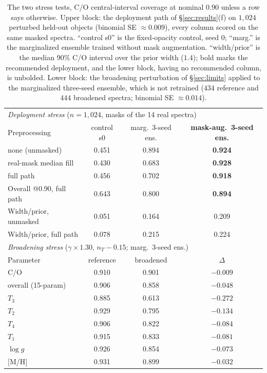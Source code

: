 \documentclass{article}
\begin{document}
\begin{table}[h]
\centering
\caption{The two stress tests, C/O central-interval coverage at nominal $0.90$
unless a row says otherwise. Upper block: the deployment path of
\S\ref{sec:results}(f) on $1{,}024$ perturbed held-out objects (binomial SE
$\approx0.009$), every column scored on the same masked spectra. ``control s0''
is the fixed-opacity control, seed 0; ``marg.'' is the marginalized ensemble
trained without mask augmentation. ``width/prior'' is the median $90\%$ C/O
interval over the prior width ($1.4$); bold marks the recommended deployment, and
the lower block, having no recommended column, is unbolded. Lower block: the
broadening perturbation of \S\ref{sec:limits} applied to the marginalized
three-seed ensemble, which is not retrained ($434$ reference and $444$ broadened
spectra; binomial SE $\approx0.014$).}
\label{tab:stress}
\begin{tabular}{lccc}
\toprule
\multicolumn{4}{l}{\emph{Deployment stress} ($n=1{,}024$, masks of the 14 real spectra)} \\
Preprocessing & control s0 & marg.\ 3-seed ens. & \textbf{mask-aug.\ 3-seed ens.} \\
\midrule
none (unmasked) & 0.451 & 0.894 & \textbf{0.924} \\
real-mask median fill & 0.430 & 0.683 & \textbf{0.928} \\
full path & 0.456 & 0.702 & \textbf{0.918} \\
\midrule
Overall @0.90, full path & 0.643 & 0.800 & \textbf{0.894} \\
Width/prior, unmasked & 0.051 & 0.164 & 0.209 \\
Width/prior, full path & 0.078 & 0.215 & 0.224 \\
\midrule
\multicolumn{4}{l}{\emph{Broadening stress} ($\gamma\times1.30$, $n_{T}-0.15$;
marg.\ 3-seed ens.)} \\
Parameter & reference & broadened & $\Delta$ \\
\midrule
C/O                & 0.910 & 0.901 & $-0.009$ \\
overall (15-param) & 0.906 & 0.858 & $-0.048$ \\
$T_3$              & 0.885 & 0.613 & $-0.272$ \\
$T_2$              & 0.929 & 0.795 & $-0.134$ \\
$T_4$              & 0.906 & 0.822 & $-0.084$ \\
$T_1$              & 0.915 & 0.833 & $-0.081$ \\
$\log g$           & 0.926 & 0.854 & $-0.073$ \\
$[$M/H$]$          & 0.931 & 0.899 & $-0.032$ \\
\bottomrule
\end{tabular}
\end{table}
\end{document}
